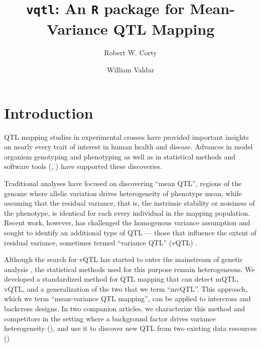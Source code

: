 \documentclass[9pt,twocolumn,twoside]{gsag3jnl}
\title{\texttt{vqtl}: An \texttt{R} package for Mean-Variance QTL Mapping}
\author[$\ast$,1]{Robert W. Corty}
\author[$\ast, 1$]{William Valdar}
\affil[$\ast$]{University of North Carolina at Chapel Hill, Department of Genetics}
\begin{document}
\maketitle
\thispagestyle{firststyle}
\logomark
\articletypemark
\marginmark
\firstpagefootnote
{}
\vspace{-24pt}%



\section*{Introduction}

QTL mapping studies in experimental crosses have provided important insights on nearly every trait of interest in human health and disease.
Advances in model organism genotyping \citep{Williams1990} and phenotyping \citep{Yang2014a} as well as in statistical methods \citep{Lander1989a,Martinez1992} and software tools (\eg, \citealt{Broman2003,Mulligan2017}) have supported these discoveries.

Traditional analyses have focused on discovering ``mean QTL'', regions of the genome where allelic variation drives heterogeneity of phenotype mean, while assuming that the residual variance, that is, the instrinsic stability or noisiness of the phenotype, is identical for each every individual in the mapping population.
Recent work, however, has challenged the homogenous variance assumption and sought to identify an additional type of QTL --- those that
influence the extent of residual variance, sometimes termed ``variance QTL'' (vQTL) \citep{Pare2010,Ronnegard2011a,Ronnegard2012,Cao2014}.

Although the search for vQTL has started to enter the mainstream of genetic analysis \citep{Yang2012,Hulse2013,Ayroles2015,Wei2016-lt,Wang2017,Wei2017-tt}, the statistical methods used for this purpose remain heterogeneous.
We developed a standardized method for QTL mapping that can detect mQTL, vQTL, and a generalization of the two that we term ``mvQTL''.
This approach, which we term ``mean-variance QTL mapping'', can be applied to intercross and backcross designs.
In two companion articles, we characterize this method and competitors in the setting where a background factor drives variance heterogeneity (\CortyMethodsPaper), and use it to discover new QTL from two existing data resources (\CortyReanalysisPaper)
\end{document}

